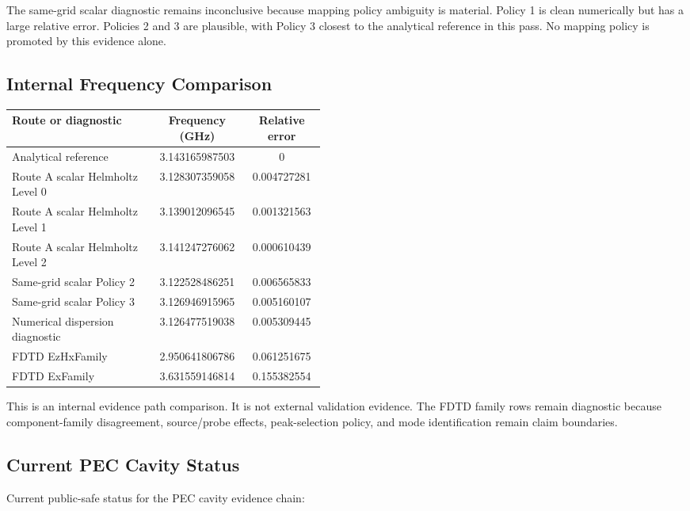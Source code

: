 \documentclass[11pt,a4paper]{article}
\begin{document}
The same-grid scalar diagnostic remains inconclusive because mapping policy ambiguity is material. Policy 1 is clean numerically but has a large relative error. Policies 2 and 3 are plausible, with Policy 3 closest to the analytical reference in this pass. No mapping policy is promoted by this evidence alone.

\subsection{Internal Frequency Comparison}

\begin{longtable}{p{0.46\linewidth}cc}
\toprule
\textbf{Route or diagnostic} & \textbf{Frequency (GHz)} & \textbf{Relative error}\\
\midrule
\endhead
Analytical reference & 3.143165987503 & 0\\
Route A scalar Helmholtz Level 0 & 3.128307359058 & 0.004727281\\
Route A scalar Helmholtz Level 1 & 3.139012096545 & 0.001321563\\
Route A scalar Helmholtz Level 2 & 3.141247276062 & 0.000610439\\
Same-grid scalar Policy 2 & 3.122528486251 & 0.006565833\\
Same-grid scalar Policy 3 & 3.126946915965 & 0.005160107\\
Numerical dispersion diagnostic & 3.126477519038 & 0.005309445\\
FDTD EzHxFamily & 2.950641806786 & 0.061251675\\
FDTD ExFamily & 3.631559146814 & 0.155382554\\
\bottomrule
\end{longtable}

This is an internal evidence path comparison. It is not external validation evidence. The FDTD family rows remain diagnostic because component-family disagreement, source/probe effects, peak-selection policy, and mode identification remain claim boundaries.

\subsection{Current PEC Cavity Status}

Current public-safe status for the PEC cavity evidence chain:
\end{document}
